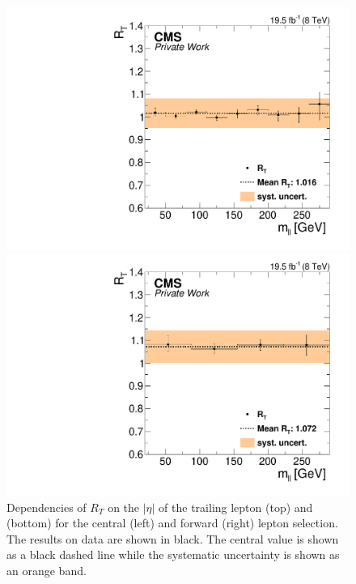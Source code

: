 \begin{figure}[htbp]
\begin{minipage}[t]{0.49\textwidth}
  \includegraphics[width=\textwidth]{plots/BG/trigger/Triggereff_SFvsOF_Syst_AlphaT_HighHTExclusiveCentral_Full2012_Mll_None.pdf}
\end{minipage}
\begin{minipage}[t]{0.49\textwidth}
\includegraphics[width=\textwidth]{plots/BG/trigger/Triggereff_SFvsOF_Syst_AlphaT_HighHTExclusiveForward_Full2012_Mll_None.pdf}
\end{minipage}
\caption{Dependencies of $R_T$ on the $|\eta|$ of the trailing lepton (top) and \mll (bottom) for the central (left) and forward (right) lepton selection. The results on data are shown in black. The central value is shown as a black dashed line while the systematic uncertainty is shown as an orange band.}
\label{fig:RTDependenciesApp2}
\end{figure}  


